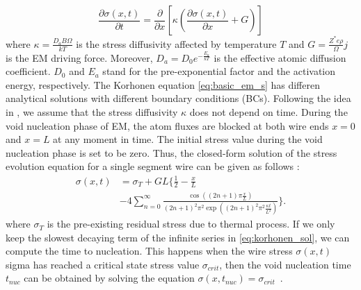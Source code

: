 %
\begin{equation}
\label{eq:basic_em_s}
\frac{\partial \sigma(x,t)}{\partial t}=\frac{\partial }{\partial x}\left[\kappa\left(\frac{\partial \sigma(x,t)}{\partial x}+G\right)\right]
\end{equation}
where $\kappa=\frac{D_aB\Omega}{kT}$ is the stress diffusivity
affected by temperature $T$ and $G=\frac{Z^*e\rho}{\Omega}j$ is the EM
driving force. Moreover, $D_a=D_0e^{-\frac{E_a}{kT}}$ is the effective
atomic diffusion coefficient. $D_0$ and $E_a$ stand for the
pre-exponential factor and the activation energy, respectively. The
Korhonen equation \eqref{eq:basic_em_s} has differen analytical
solutions with different boundary conditions (BCs). Following the idea
in \cite{Korhonen:jap1993}, we assume that the stress diffusivity
$\kappa$ does not depend on time. During the void nucleation phase of
EM, the atom fluxes are blocked at both wire ends $x=0$ and $x=L$ at
any moment in time. The initial stress value during the void
nucleation phase is set to be zero. Thus, the closed-form solution of
the stress evolution equation for a single segment wire can be given
as follows \cite{Korhonen:jap1993}:
\begin{equation} \label{eq:korhonen_sol}
\begin{split}
\sigma(x,t)&= \sigma_T+ GL\{\frac{1}{2}-\frac{x}{L}\\
&-4\sum\limits_{n=0}^{\infty}\frac{\cos((2n+1)\pi
\frac{x}{L})}{(2n+1)^2\pi^2\exp((2n+1)^2\pi^2\frac{\kappa
t}{L^2})}\}.
\end{split}
\end{equation}
where $\sigma_T$ is the pre-existing residual stress due to thermal
process. If we only keep the slowest decaying term of the infinite
series in \eqref{eq:korhonen_sol}, we can compute the time to
nucleation. This happens when the wire stress $\sigma(x,t)$ sigma has
reached a critical state stress value $\sigma_{crit}$, then the void
nucleation time $t_{nuc}$ can be obtained by solving the equation
$\sigma(x,t_{nuc})=\sigma_{crit}$~\cite{HuangYu:DAC'14}.

